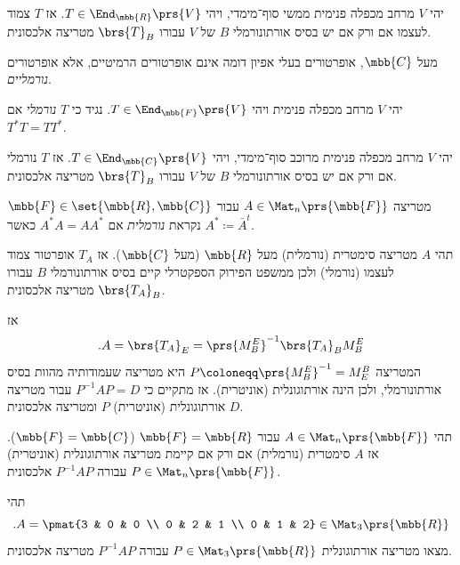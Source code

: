 \documentclass[a4paper,10pt,twoside,openany]{book}
\begin{document}
\begin{theorem}
יהי
$V$
מרחב מכפלה פנימית ממשי סוף־מימדי, ויהי
$T \in \End_{\mbb{R}}\prs{V}$.
אז
$T$
צמוד לעצמו אם ורק אם יש בסיס אורתונורמלי
$B$
של
$V$
עבורו
$\brs{T}_B$
מטריצה אלכסונית.
\end{theorem}

מעל
$\mbb{C}$,
אופרטורים בעלי אפיון דומה אינם אופרטורים הרמיטיים, אלא אופרטורים
\emph{נורמליים}.

\begin{definition}
יהי
$V$
מרחב מכפלה פנימית ויהי
$T \in \End_{\mbb{F}}\prs{V}$.
נגיד כי
$T$
\emph{נורמלי}
אם
$T^* T = T T^*$.
\end{definition}

\begin{theorem}
יהי
$V$
מרחב מכפלה פנימית מרוכב סוף־מימדי, ויהי
$T \in \End_{\mbb{C}}\prs{V}$.
אז
$T$
נורמלי אם ורק אם יש בסיס אורתונורמלי
$B$
של
$V$
עבורו
$\brs{T}_B$
מטריצה אלכסונית.
\end{theorem}

\begin{definition}
מטריצה
$A \in \Mat_n\prs{\mbb{F}}$
עבור
$\mbb{F} \in \set{\mbb{R}, \mbb{C}}$
נקראת
\emph{נורמלית}
אם
$A^* A = A A^*$
כאשר
$A^* \coloneqq \bar{A}^t$.
\end{definition}

\begin{remark}
תהי
$A$
מטריצה סימטרית (נורמלית) מעל
$\mbb{R}$
(מעל
$\mbb{C}$).
אז
$T_A$
אופרטור צמוד לעצמו (נורמלי) ולכן ממשפט הפירוק הספקטרלי קיים בסיס אורתונורמלי
$B$
עבורו
$\brs{T_A}_B$
מטריצה אלכסונית.

אז
\[\text{.} A = \brs{T_A}_E = \prs{M^E_B}^{-1} \brs{T_A}_B M^E_B\]
המטריצה
$P \coloneqq \prs{M^E_B}^{-1} = M^B_E$
היא מטריצה שעמודותיה מהוות בסיס אורתונורמלי, ולכן הינה אורתוגונלית (אוניטרית). אז מתקיים כי
$P^{-1} A P = D$
עבור מטריצה אורתוגונלית (אוניטרית)
$P$
ומטריצה אלכסונית
$D$.
\end{remark}

\begin{theorem}
תהי
$A \in \Mat_n\prs{\mbb{F}}$
עבור
$\mbb{F} = \mbb{R}$
($\mbb{F} = \mbb{C}$).
אז
$A$
סימטרית (נורמלית) אם ורק אם קיימת מטריצה אורתוגונלית (אוניטרית)
$P \in \Mat_n\prs{\mbb{F}}$
עבורה
$P^{-1} A P$
אלכסונית.
\end{theorem}

\begin{exercisechap}
תהי
\[\text{.} A = \pmat{3 & 0 & 0 \\ 0 & 2 & 1 \\ 0 & 1 & 2} \in \Mat_3\prs{\mbb{R}}\]
מצאו מטריצה אורתוגונלית
$P \in \Mat_3\prs{\mbb{R}}$
עבורה
$P^{-1} A P$
מטריצה אלכסונית.
\end{exercisechap}
\end{document}
